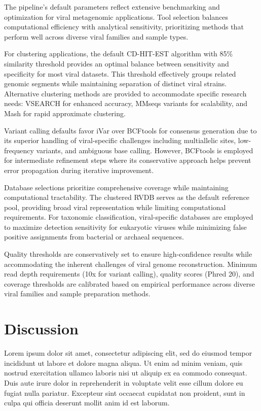 \documentclass[unnumsec,webpdf,contemporary,large]{oup-authoring-template}%
\theoremstyle{thmstyleone}%
\theoremstyle{thmstyletwo}%
\theoremstyle{thmstylethree}%
\begin{document}
The pipeline's default parameters reflect extensive benchmarking and optimization for viral metagenomic applications. Tool selection balances computational efficiency with analytical sensitivity, prioritizing methods that perform well across diverse viral families and sample types.

For clustering applications, the default CD-HIT-EST \cite{Li2006-nj} algorithm with 85\% similarity threshold provides an optimal balance between sensitivity and specificity for most viral datasets. This threshold effectively groups related genomic segments while maintaining separation of distinct viral strains. Alternative clustering methods are provided to accommodate specific research needs: VSEARCH \cite{Rognes2016-ju} for enhanced accuracy, MMseqs variants for scalability, and Mash \cite{Ondov2019-bo} for rapid approximate clustering.

Variant calling defaults favor iVar over BCFtools for consensus generation due to its superior handling of viral-specific challenges including multiallelic sites, low-frequency variants, and ambiguous base calling. However, BCFtools is employed for intermediate refinement steps where its conservative approach helps prevent error propagation during iterative improvement.

Database selections prioritize comprehensive coverage while maintaining computational tractability. The clustered RVDB serves as the default reference pool, providing broad viral representation while limiting computational requirements. For taxonomic classification, viral-specific databases are employed to maximize detection sensitivity for eukaryotic viruses while minimizing false positive assignments from bacterial or archaeal sequences.

Quality thresholds are conservatively set to ensure high-confidence results while accommodating the inherent challenges of viral genome reconstruction. Minimum read depth requirements (10x for variant calling), quality scores (Phred 20), and coverage thresholds are calibrated based on empirical performance across diverse viral families and sample preparation methods.

\section{Discussion}\label{sec4}

Lorem ipsum dolor sit amet, consectetur adipiscing elit, sed do eiusmod tempor incididunt ut labore et dolore magna aliqua. Ut enim ad minim veniam, quis nostrud exercitation ullamco laboris nisi ut aliquip ex ea commodo consequat. Duis aute irure dolor in reprehenderit in voluptate velit esse cillum dolore eu fugiat nulla pariatur. Excepteur sint occaecat cupidatat non proident, sunt in culpa qui officia deserunt mollit anim id est laborum.
\end{document}
